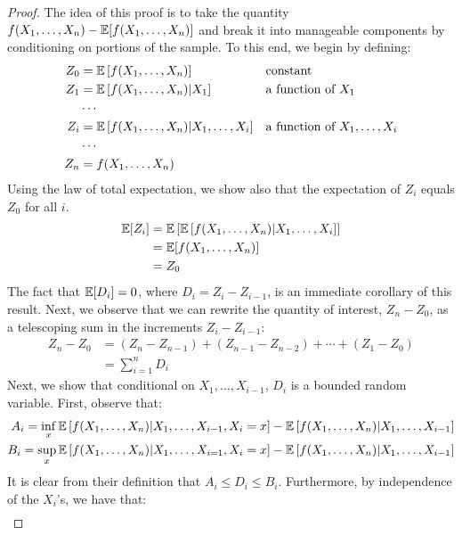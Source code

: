 \begin{proof}
    The idea of this proof is to take the quantity $f(X_1,\dots,X_n) - \operatorname*{\mathbb{E}}[f(X_1,\dots,X_n)]$ and break it into manageable components by conditioning on portions of the sample. To this end, we begin by defining:
	\begin{align*}
	 	Z_0 &= \operatorname*{\mathbb{E}} \left[f(X_1,\dots,X_n) \right] &&\text{constant}\\
	 	Z_1 &= \operatorname*{\mathbb{E}} \left[f(X_1,\dots,X_n) \lvert X_1 \right] &&\text{a function of $X_1$} \\
        &\cdots \\
        Z_i &= \operatorname*{\mathbb{E}} \left [f(X_1,\dots,X_n) | X_1,\dots,X_i \right] &&\text{a function of $X_1,\dots,X_i$} \\
	 	&\cdots \\
        Z_n &= f(X_1,\dots,X_n)
	\end{align*}
    Using the law of total expectation, we show also that the expectation of $Z_i$ equals $Z_0$ for all $i$.
    \begin{align*}
        \operatorname*{\mathbb{E}} [Z_i] &= \operatorname*{\mathbb{E}} \left [ \operatorname*{\mathbb{E}} \left [f(X_1,\dots,X_n) | X_1,\dots,X_i \right] \right] \\
        &= \operatorname*{\mathbb{E}}[f(X_1,\dots,X_n)] \\
        &= Z_0
    \end{align*}
    The fact that $\mathbb{E}[D_i] = 0$, where $D_i = Z_i - Z_{i - 1}$, is an immediate corollary of this result. Next, we observe that we can rewrite the quantity of interest, $Z_n - Z_0$, as a telescoping sum in the increments $Z_i - Z_{i - 1}$:
    \begin{align*}
        Z_n - Z_0 &= (Z_n - Z_{n - 1}) + (Z_{n - 1} - Z_{n - 2}) + \cdots + (Z_1 - Z_0) \\
        &= \sum_{i = 1}^n D_i
    \end{align*} 
    Next, we show that conditional on $X_1,\dots,X_{i - 1}$, $D_i$ is a bounded random variable. First, observe that:
    \begin{align*}
        A_i = \inf_x \operatorname*{\mathbb{E}} \left[ f(X_1,\dots,X_n) | X_1,\dots,X_{i - 1}, X_i = x \right] - \operatorname*{\mathbb{E}} \left[ f(X_1,\dots,X_n) | X_1,\dots,X_{i - 1} \right] \\
        B_i = \sup_x \operatorname*{\mathbb{E}} \left [ f(X_1,\dots,X_n) | X_1,\dots,X_{i = 1}, X_i = x \right] - \operatorname*{\mathbb{E}} \left[ f(X_1,\dots,X_n) | X_1,\dots,X_{i - 1} \right]
    \end{align*}
    It is clear from their definition that $A_i \leq D_i \leq B_i$. Furthermore, by independence of the $X_i$'s, we have that:
    \begin{align*}

\end{align*}
\end{proof}
